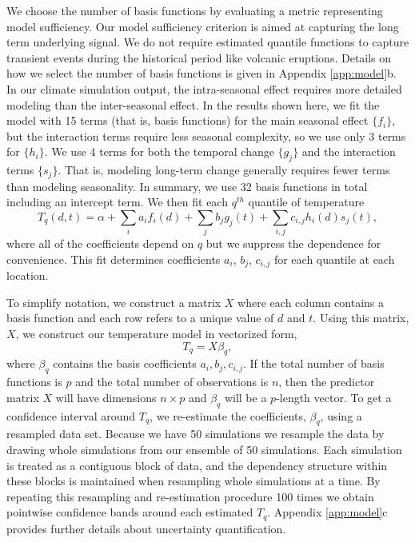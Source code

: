 \documentclass{ametsoc}
\begin{document}
We choose the number of basis functions by evaluating a metric representing model sufficiency. Our model sufficiency criterion is aimed at capturing the long term underlying signal. We do not require estimated quantile functions to capture transient events during the historical period like volcanic eruptions. Details on how we select the number of basis functions is given in Appendix \ref{app:model}b. In our climate simulation output, the intra-seasonal effect requires more detailed modeling than the inter-seasonal effect. In the results shown here, we fit the model with 15 terms (that is, basis functions) for the main seasonal effect $\{f_i\}$, but the interaction terms require less seasonal complexity, so we use only 3 terms for $\{h_i\}$.  
We use 4 terms for both the temporal change $\{g_j\}$ and the interaction terms $\{s_j\}$. 
That is, modeling long-term change generally requires fewer terms than modeling seasonality. In summary, we use 32 basis functions in total including an intercept term. We then fit each $q^{th}$ quantile of temperature %
\begin{equation}
T_q(d, t) = \alpha + \sum_ia_if_i(d) + \sum_jb_j g_j(t) + \sum_{i,j}c_{i,j} h_i(d)s_j(t),
\end{equation}
 where all of the coefficients depend on $q$ but we suppress the dependence for convenience. This fit determines coefficients $a_i$, $b_j$, $c_{i,j}$ for each quantile at each location.

 To simplify notation, we construct a matrix $X$ where each column contains a basis function and each row refers to a unique value of $d$ and $t$. Using this matrix, $X$, we construct our temperature model in vectorized form,
 \begin{equation}
 \label{eq:matrix_version}
 T_q = X\beta_q, 
 \end{equation}
 where $\beta_q$ contains the basis coefficients $a_i, b_j, c_{i,j}$. If the total number of basis functions is $p$ and the total number of observations is $n$, then the predictor matrix $X$ will have dimensions $n \times p$ and $\beta_q$ will be a $p$-length vector. To get a confidence interval around $T_q$, we re-estimate the coefficients, $\beta_q$, using a resampled data set. Because we have 50 simulations we resample the data by drawing whole simulations from our ensemble of 50 simulations. Each simulation is treated as a contiguous block of data, and the dependency structure within these blocks is maintained when resampling whole simulations at a time. By repeating this resampling and re-estimation procedure 100 times we obtain pointwise confidence bands around each estimated $T_q$. Appendix \ref{app:model}c provides further details about uncertainty quantification. 
\end{document}
